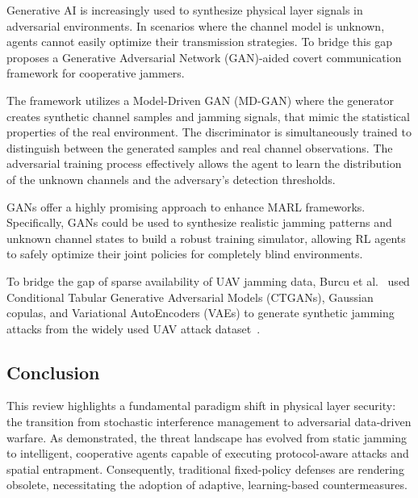 \documentclass[conference]{IEEEtran}
\newcommand{\adm}[1]{{\color{orange}{[#1]}}}
\newcommand{\rar}[1]{{\color{blue}{[#1]}}}
\begin{document}
Generative AI is increasingly used to synthesize physical layer signals in adversarial environments. \adm{cite} 
In scenarios where the channel model is unknown, agents cannot easily optimize their transmission strategies. 
To bridge this gap~ proposes a Generative Adversarial Network (GAN)-aided covert communication framework for cooperative jammers.

The framework utilizes a Model-Driven GAN (MD-GAN) where the generator creates synthetic channel samples and jamming signals, that mimic the statistical properties of the real environment. 
The discriminator is simultaneously trained to distinguish between the generated samples and real channel observations. 
The adversarial training process effectively allows the agent to learn the distribution of the unknown channels and the adversary's detection thresholds.

GANs offer a highly promising approach to enhance MARL frameworks.
Specifically, GANs could be used to synthesize realistic jamming patterns and unknown channel states to build a robust training simulator, allowing RL agents to safely optimize their joint policies for completely blind environments.

To bridge the gap of sparse availability of UAV  jamming data, Burcu et al.~ used Conditional Tabular Generative Adversarial Models (CTGANs), Gaussian copulas, and Variational AutoEncoders (VAEs) to generate synthetic jamming attacks from the widely used UAV attack dataset~. \rar{But, it doesnt synthesize the actual signal... dataset doesnt include it either.. -> not really PHY}

\subsection{Conclusion} \rar{a whole section is not really needed for related works rather a final paragraph.}
This review highlights a fundamental paradigm shift in physical layer security: the transition from stochastic interference management to adversarial data-driven warfare. 
As demonstrated, the threat landscape has evolved from static jamming to intelligent, cooperative agents capable of executing protocol-aware attacks and spatial entrapment. 
Consequently, traditional fixed-policy defenses are rendering obsolete, necessitating the adoption of adaptive, learning-based countermeasures.
\end{document}
